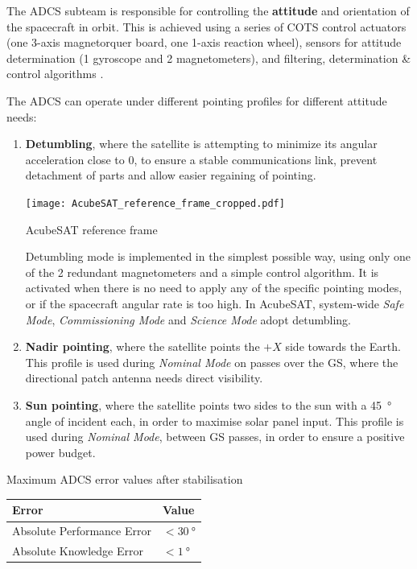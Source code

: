 \documentclass[a4paper,nobib]{tufte-book}
\begin{document}
The \ac{ADCS} subteam is responsible for controlling the \textbf{attitude} and orientation of the spacecraft in orbit. This is achieved using a series of \ac{COTS} control actuators (one 3-axis magnetorquer board, one 1-axis reaction wheel), sensors for attitude determination (1 gyroscope and 2 magnetometers), and filtering, determination \& control algorithms \autocite{DDJF_AOCS}.

The \ac{ADCS} can operate under different pointing profiles for different attitude needs:
\begin{enumerate}
	\item \textbf{Detumbling}, where the satellite is attempting to minimize its angular acceleration close to 0, to ensure a stable communications link, prevent detachment of parts and allow easier regaining of pointing.
	
	\begin{marginfigure}
		\centering
		\texttt{[image: AcubeSAT\_reference\_frame\_cropped.pdf]}
		\caption{AcubeSAT reference frame}
		\label{fig:frame}
	\end{marginfigure}
	
	Detumbling mode is implemented in the simplest possible way, using only one of the 2 redundant magnetometers and a simple control algorithm. It is activated when there is no need to apply any of the specific pointing modes, or if the spacecraft angular rate is too high. In AcubeSAT, system-wide \emph{Safe Mode}, \emph{Commissioning Mode} and \emph{Science Mode} adopt detumbling.
	
	\item \textbf{Nadir pointing}, where the satellite points the \(+X\) side towards the Earth. This profile is used during \emph{Nominal Mode} on passes over the \acl{GS}, where the directional patch antenna needs direct visibility.
	
	\item \textbf{Sun pointing}, where the satellite points two sides to the sun with a \SI{45}{\degree} angle of incident each, in order to maximise solar panel input. This profile is used during \emph{Nominal Mode}, between \ac{GS} passes, in order to ensure a positive power budget.
\end{enumerate}

\begin{margintable}
	\centering
	\caption[Maximum ADCS error values after stabilisation]{Maximum \ac{ADCS} error values after stabilisation}
	\label{tab:adcsape}
	\begin{tabular}{@{}ll@{}}
		\toprule
		Error                      & Value                    \\ \midrule
		Absolute Performance Error & \( < \SI{30}{\degree} \) \\
		Absolute Knowledge Error   & \( < \SI{1}{\degree} \) 
	\end{tabular}
\end{margintable}
\end{document}
